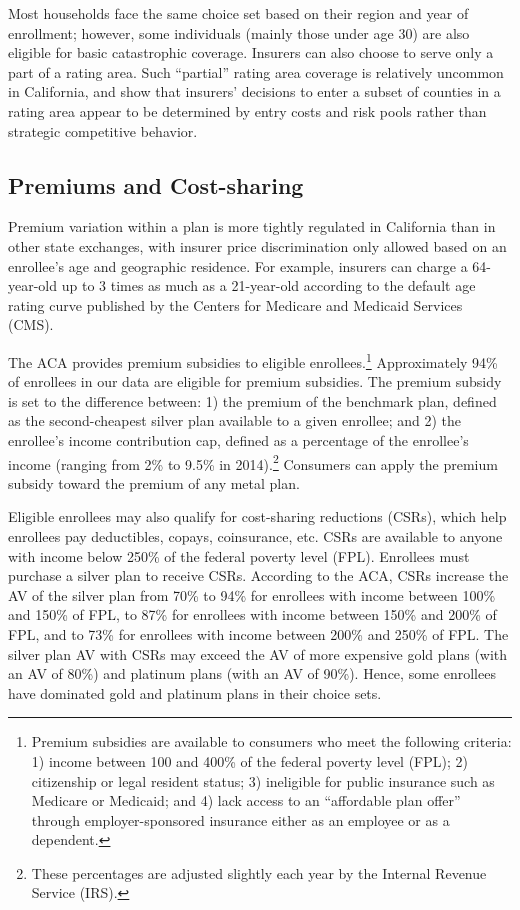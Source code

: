 \documentclass[12pt]{article}
\begin{document}
Most households face the same choice set based on their region and year of enrollment; however, some individuals (mainly those under age 30) are also eligible for basic catastrophic coverage. Insurers can also choose to serve only a part of a rating area. Such ``partial'' rating area coverage is relatively uncommon in California, and \cite{fang2025} show that insurers' decisions to enter a subset of counties in a rating area appear to be determined by entry costs and risk pools rather than strategic competitive behavior.

\subsection{Premiums and Cost-sharing}
Premium variation within a plan is more tightly regulated in California than in other state exchanges, with insurer price discrimination only allowed based on an enrollee's age and geographic residence. For example, insurers can charge a 64-year-old up to 3 times as much as a 21-year-old according to the default age rating curve published by the Centers for Medicare and Medicaid Services (CMS).

The ACA provides premium subsidies to eligible enrollees.\footnote{Premium subsidies are available to consumers who meet the following criteria: 1) income between 100 and 400\% of the federal poverty level (FPL); 2) citizenship or legal resident status; 3) ineligible for public insurance such as Medicare or Medicaid; and 4) lack access to an ``affordable plan offer'' through employer-sponsored insurance either as an employee or as a dependent.} Approximately 94\% of enrollees in our data are eligible for premium subsidies.  The premium subsidy is set to the difference between: 1) the premium of the benchmark plan, defined as the second-cheapest silver plan available to a given enrollee; and 2) the enrollee's income contribution cap, defined as a percentage of the enrollee's income (ranging from 2\% to 9.5\% in 2014).\footnote{These percentages are adjusted slightly each year by the Internal Revenue Service (IRS).}  Consumers can apply the premium subsidy toward the premium of any metal plan.

Eligible enrollees may also qualify for cost-sharing reductions (CSRs), which help enrollees pay deductibles, copays, coinsurance, etc.   CSRs are available to anyone with income below 250\% of the federal poverty level (FPL). Enrollees must purchase a silver plan to receive CSRs. According to the ACA, CSRs increase the AV of the silver plan from 70\% to 94\% for enrollees with income between 100\% and 150\% of FPL, to 87\% for enrollees with income between 150\% and 200\% of FPL, and to 73\% for enrollees with income between 200\% and 250\% of FPL.  The silver plan AV with CSRs may exceed the AV of more expensive gold plans (with an AV of 80\%) and platinum plans (with an AV of 90\%).  Hence, some enrollees have dominated gold and platinum plans in their choice sets.
\end{document}
